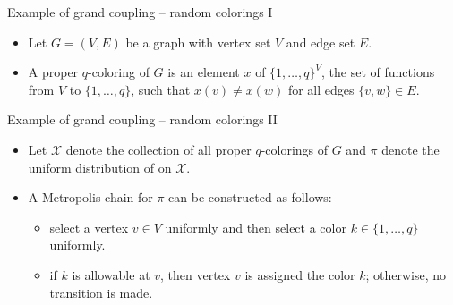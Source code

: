 \documentclass{beamer}
\renewcommand{\>}{\rangle}
\newcommand{\<}{\langle}
\newcommand{\cX}{\mathcal{X}}
\begin{document}

\begin{frame}{Example of grand coupling -- random colorings I}
\begin{itemize}
    \item Let $G=(V,E)$ be a graph with vertex set $V$ and edge set $E$. 

    \medskip
    \item A proper $q$-coloring of $G$ is an element $x$ of $\{1,\ldots,q\}^V$, the set of functions from $V$ to $\{1,\ldots,q\}$, such that $x(v)\neq x(w)$ for all edges $\{v,w\}\in E$.

\medskip
{}

\end{itemize}
\end{frame}


\begin{frame}{Example of grand coupling -- random colorings II}
\begin{itemize}
    \item Let $\cX$ denote the collection of all proper $q$-colorings of $G$ and $\pi$ denote the uniform distribution of on $\cX$.

    \medskip
    \item A Metropolis chain for $\pi$ can be constructed as follows:

    \medskip
    \begin{itemize}
        \item select a vertex $v\in V$ uniformly and then select a color $k\in\{1,\ldots,q\}$ uniformly. 

        \medskip
        \item if $k$ is allowable at $v$, then vertex $v$ is assigned the color $k$; otherwise, no transition is made.
    \end{itemize}

\end{itemize}
\end{frame}
\end{document}
